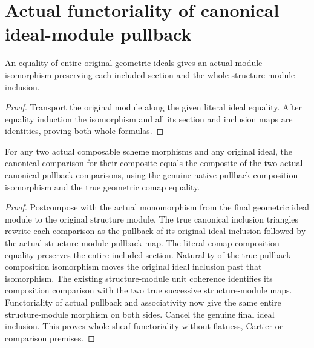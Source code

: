 \section{Actual functoriality of canonical ideal-module pullback}
\begin{lemma}
\label{lem:actual-ideal-module-equality-iso}
\leanok
{}
An equality of entire original geometric ideals gives an actual module
isomorphism preserving each included section and the whole structure-module
inclusion.
\end{lemma}
\begin{proof}
Transport the original module along the given literal ideal equality.
After equality induction the isomorphism and all its section and inclusion
maps are identities, proving both whole formulas.
\end{proof}

\begin{lemma}
\label{lem:actual-ideal-module-canonical-pullback-comp}
\leanok
{}
For any two actual composable scheme morphisms and any original ideal,
the canonical comparison for their composite equals the composite of the
two actual canonical pullback comparisons, using the genuine native
pullback-composition isomorphism and the true geometric comap equality.
\end{lemma}
\begin{proof}
Postcompose with the actual monomorphism from the final geometric ideal
module to the original structure module. The true canonical inclusion
triangles rewrite each comparison as the pullback of its original ideal
inclusion followed by the actual structure-module pullback map. The
literal comap-composition equality preserves the entire included section.
Naturality of the true pullback-composition isomorphism moves the original
ideal inclusion past that isomorphism. The existing structure-module
unit coherence identifies its composition comparison with the two true
successive structure-module maps. Functoriality of actual pullback and
associativity now give the same entire structure-module morphism on both
sides. Cancel the genuine final ideal inclusion. This proves whole
sheaf functoriality without flatness, Cartier or comparison premises.
\end{proof}


